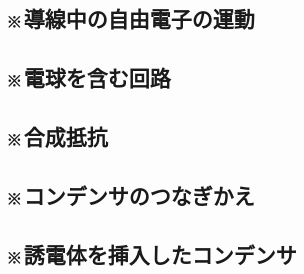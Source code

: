 \documentclass[../../ps_q.tex]{subfiles}
\begin{document}
\subsection{※導線中の自由電子の運動}
    

    \vspace{2cm}
    \vfill

\subsection{※電球を含む回路}
    

    \vspace{2cm}
    \vfill

\subsection{※合成抵抗}
    

    \vspace{2cm}
    \vfill

\subsection{※コンデンサのつなぎかえ}
    

    \vspace{2cm}
    \vfill

\subsection{※誘電体を挿入したコンデンサ}
    

    \vspace{2cm}
    \vfill
\end{document}
